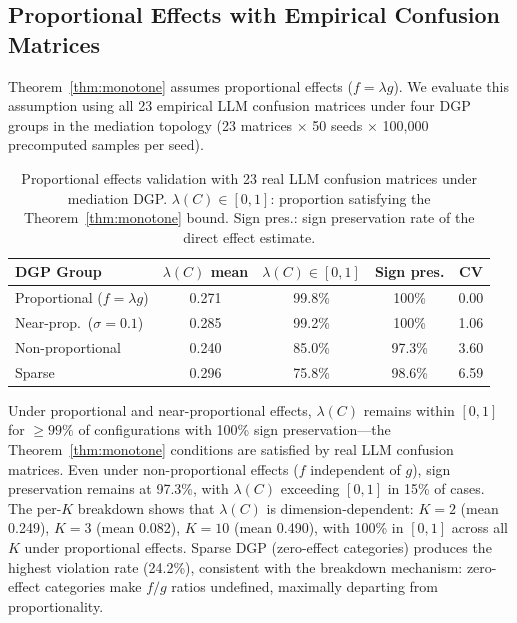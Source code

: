 \subsection{Proportional Effects with Empirical Confusion Matrices}
\label{sec:proportional_real_matrices}

Theorem~\ref{thm:monotone} assumes proportional effects ($f = \lambda g$). We evaluate this assumption using all 23 empirical LLM confusion matrices under four DGP groups in the mediation topology (23 matrices $\times$ 50 seeds $\times$ 100{,}000 precomputed samples per seed).

\begin{table}[h]
\centering
\small
\caption{Proportional effects validation with 23 real LLM confusion matrices under mediation DGP. $\lambda(C) \in [0,1]$: proportion satisfying the Theorem~\ref{thm:monotone} bound. Sign pres.: sign preservation rate of the direct effect estimate.}
\label{tab:proportional_empirical}
\begin{tabular}{lcccc}
\toprule
\textbf{DGP Group} & $\lambda(C)$ \textbf{mean} & $\lambda(C) \in [0,1]$ & \textbf{Sign pres.} & \textbf{CV} \\
\midrule
Proportional ($f{=}\lambda g$) & 0.271 & 99.8\% & 100\% & 0.00 \\
Near-prop.\ ($\sigma{=}0.1$) & 0.285 & 99.2\% & 100\% & 1.06 \\
Non-proportional & 0.240 & 85.0\% & 97.3\% & 3.60 \\
Sparse & 0.296 & 75.8\% & 98.6\% & 6.59 \\
\bottomrule
\end{tabular}
\end{table}

Under proportional and near-proportional effects, $\lambda(C)$ remains within $[0,1]$ for ${\geq}99\%$ of configurations with 100\% sign preservation---the Theorem~\ref{thm:monotone} conditions are satisfied by real LLM confusion matrices. Even under non-proportional effects ($f$ independent of $g$), sign preservation remains at 97.3\%, with $\lambda(C)$ exceeding $[0,1]$ in 15\% of cases. The per-$K$ breakdown shows that $\lambda(C)$ is dimension-dependent: $K{=}2$ (mean 0.249), $K{=}3$ (mean 0.082), $K{=}10$ (mean 0.490), with 100\% in $[0,1]$ across all $K$ under proportional effects. Sparse DGP (zero-effect categories) produces the highest violation rate (24.2\%), consistent with the breakdown mechanism: zero-effect categories make $f/g$ ratios undefined, maximally departing from proportionality.

